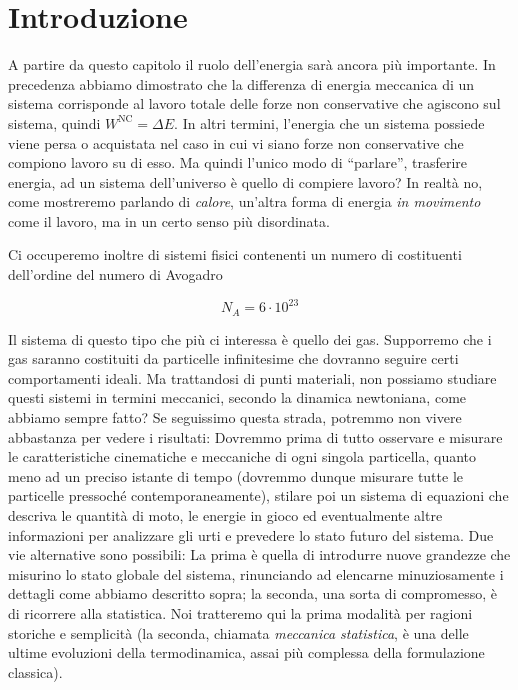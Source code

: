 \marginpar{\minitoc}

\section{Introduzione}
A partire da questo capitolo il ruolo dell'energia sarà ancora più
importante. In precedenza abbiamo dimostrato che la differenza di
energia meccanica di un sistema corrisponde al lavoro totale delle
forze non conservative che agiscono sul sistema, quindi $W^\text{NC} = \Delta E$.
In altri termini, l'energia che un sistema possiede viene persa o
acquistata nel caso in cui vi siano forze non conservative che
compiono lavoro su di esso. Ma quindi l'unico modo di ``parlare'',
trasferire energia, ad un sistema dell'universo è quello di compiere
lavoro? In realtà no, come mostreremo parlando di \textit{calore},
un'altra forma di energia \textit{in movimento} come il lavoro, ma
in un certo senso più disordinata.

Ci occuperemo inoltre di sistemi fisici contenenti un numero di
costituenti dell'ordine del numero di Avogadro

\[ N_A = 6 \cdot 10^{23} \]

\noindent Il sistema di questo tipo che più ci interessa è quello
dei gas. Supporremo che i gas saranno costituiti da particelle
infinitesime che dovranno seguire certi comportamenti ideali. Ma
trattandosi di punti materiali, non possiamo studiare questi
sistemi in termini meccanici, secondo la dinamica newtoniana,
come abbiamo sempre fatto? Se seguissimo questa strada, potremmo
non vivere abbastanza per vedere i risultati: Dovremmo prima di
tutto osservare e misurare le caratteristiche cinematiche e
meccaniche di ogni singola particella, quanto meno ad un preciso istante di
tempo (dovremmo dunque misurare tutte le particelle pressoché
contemporaneamente), stilare poi un sistema di equazioni che
descriva le quantità di moto, le energie in gioco ed eventualmente
altre informazioni per analizzare gli urti e prevedere lo stato
futuro del sistema. Due vie alternative sono possibili: La prima è
quella di introdurre nuove grandezze che misurino lo stato globale
del sistema, rinunciando ad elencarne minuziosamente i dettagli come
abbiamo descritto sopra; la seconda, una sorta di compromesso,
è di ricorrere alla statistica. Noi tratteremo qui la prima modalità
per ragioni storiche e semplicità (la seconda, chiamata \textit{meccanica statistica},
è una delle ultime evoluzioni della termodinamica, assai più
complessa della formulazione classica).


